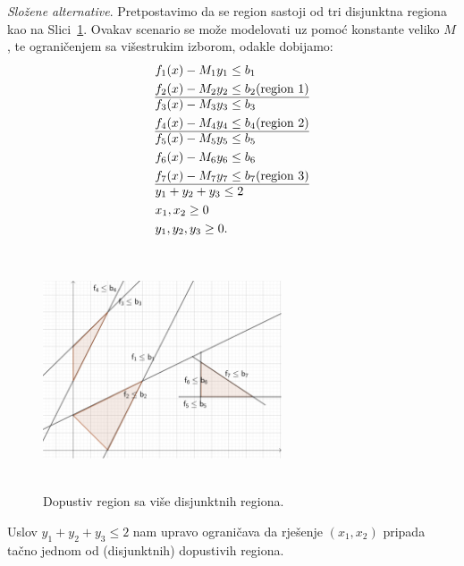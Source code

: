 \documentclass[a4paper, utf8, 11pt, colorlinks]{article}
\begin{document}
\emph{Složene alternative}. Pretpostavimo da se region sastoji od tri disjunktna regiona kao na Slici~\ref{fig:compound_regions}. Ovakav scenario se može modelovati uz pomoć konstante veliko $M$, te  ograničenjem sa višestrukim izborom, odakle dobijamo:
\begin{align*}
    &f_1(x) - M_1 y_1 \leq b_1 \\
    &f_2(x) - M_2 y_2 \leq b_2 (\mbox{region 1}) \\ \hline
    & f_3(x) - M_3 y_3 \leq b_3 \\ 
    & f_4(x) - M_4 y_4 \leq b_4 (\mbox{region 2})\\  \hline 
    & f_5(x) - M_5 y_5 \leq b_5 \\
    & f_6(x) - M_6 y_6 \leq b_6 \\
    & f_7(x) - M_7 y_7 \leq b_7 (\mbox{region 3}) \\ \hline
    & y_1 + y_2 + y_3 \leq 2 \\
    & x_1, x_2 \geq 0 \\
    & y_1, y_2, y_3 \geq 0.
\end{align*}

\begin{figure}[!ht]
    \centering
    \includegraphics[width=200pt, height=200pt]{compound.eps}
    \caption{Dopustiv region sa više disjunktnih regiona.}
    \label{fig:compound_regions}
\end{figure}
Uslov $y_1 + y_2 + y_3 \leq 2$ nam upravo ograničava da rješenje $(x_1, x_2)$ pripada tačno jednom od (disjunktnih) dopustivih regiona. 
\end{document}
